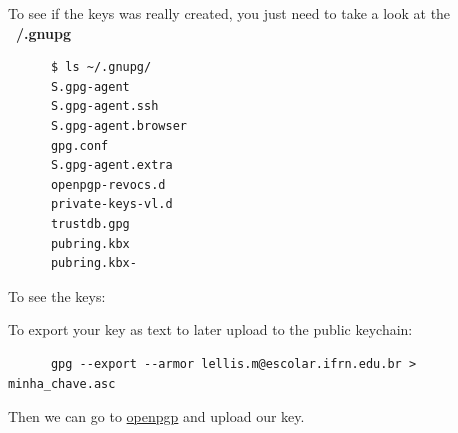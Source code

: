 \documentclass{article}
\begin{document}
To see if the keys was really created, you just need to take a look at the \textbf{~/.gnupg}

\begin{verbatim}
      $ ls ~/.gnupg/
      S.gpg-agent
      S.gpg-agent.ssh
      S.gpg-agent.browser
      gpg.conf
      S.gpg-agent.extra
      openpgp-revocs.d
      private-keys-vl.d
      trustdb.gpg
      pubring.kbx
      pubring.kbx-
\end{verbatim}

To see the keys:


To export your key as text to later upload to the public keychain:

\begin{verbatim}
      gpg --export --armor lellis.m@escolar.ifrn.edu.br > minha_chave.asc
\end{verbatim}

Then we can go to \href{https://keys.openpgp.org/}{openpgp} and upload our key.



\end{document}
